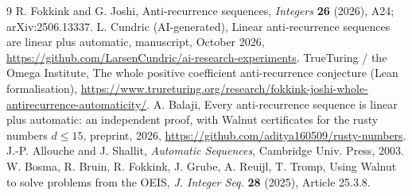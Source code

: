 \documentclass[11pt]{article}
\theoremstyle{remark}\newtheorem{remark}[theorem]{Remark}
\theoremstyle{definition}\newtheorem{definition}[theorem]{Definition}
\begin{document}
\begin{thebibliography}{9}
 R. Fokkink and G. Joshi, Anti-recurrence sequences, \emph{Integers} \textbf{26} (2026), A24; arXiv:2506.13337.
 L. Cundric (AI-generated), Linear anti-recurrence sequences are linear plus automatic, manuscript, October 2026, \url{https://github.com/LarsenCundric/ai-research-experiments}.
 TrueTuring / the Omega Institute, The whole positive coefficient anti-recurrence conjecture (Lean formalisation), \url{https://www.trureturing.org/research/fokkink-joshi-whole-antirecurrence-automaticity/}.
 A. Balaji, Every anti-recurrence sequence is linear plus automatic: an independent proof, with Walnut certificates for the rusty numbers \(d\le15\), preprint, 2026, \url{https://github.com/aditya160509/rusty-numbers}.
 J.-P. Allouche and J. Shallit, \emph{Automatic Sequences}, Cambridge Univ. Press, 2003.
 W. Bosma, R. Bruin, R. Fokkink, J. Grube, A. Reuijl, T. Tromp, Using Walnut to solve problems from the OEIS, \emph{J. Integer Seq.} \textbf{28} (2025), Article 25.3.8.
\end{thebibliography}
\end{document}
